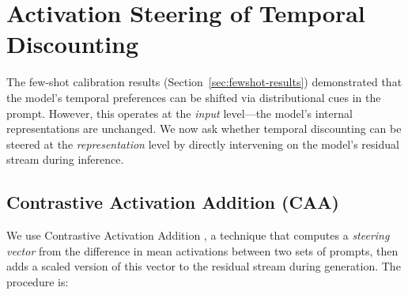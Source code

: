 \section{Activation Steering of Temporal Discounting}
\label{sec:caa-steering}

The few-shot calibration results (Section~\ref{sec:fewshot-results}) demonstrated that the model's temporal preferences can be shifted via distributional cues in the prompt. However, this operates at the \emph{input} level---the model's internal representations are unchanged. We now ask whether temporal discounting can be steered at the \emph{representation} level by directly intervening on the model's residual stream during inference.

\subsection{Contrastive Activation Addition (CAA)}
\label{sec:caa-method}

We use Contrastive Activation Addition \citep{turner2024steering}, a technique that computes a \emph{steering vector} from the difference in mean activations between two sets of prompts, then adds a scaled version of this vector to the residual stream during generation. The procedure is:

